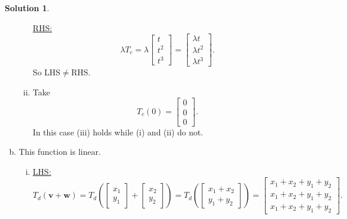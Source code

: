 \documentclass[12pt]{report} %
\theoremstyle{definition}
\newtheorem{solution}{Solution}
\begin{document}
\begin{solution}
\begin{enumerate}[(a)]
\begin{enumerate}[(i)]
        \noindent\underline{RHS:}
        \[
        \lambda T_c=\lambda \begin{bmatrix} t \\ t^2 \\ t^3 \end{bmatrix} = \begin{bmatrix} \lambda t \\ \lambda t^2 \\ \lambda t^3 \end{bmatrix}.
        \]
        So LHS$\neq$RHS.
        
        \item Take
        \[
        T_c(0)=\begin{bmatrix} 0\\0\\0\end{bmatrix}.
        \]
        In this case (iii) holds while (i) and (ii) do not.
    \end{enumerate}
    
    \item This function is linear.
    
    \begin{enumerate}[(i)]
        \item \noindent\underline{LHS:}
        \[
        T_d(\mathbf{v}+\mathbf{w})=T_d\left( \begin{bmatrix} x_1\\y_1 \end{bmatrix} + \begin{bmatrix} x_2\\y_2 \end{bmatrix} \right) =T_d\left( \begin{bmatrix} x_1+x_2\\y_1+y_2 \end{bmatrix}\right) = \begin{bmatrix} x_1+x_2+y_1+y_2\\x_1+x_2+y_1+y_2\\ x_1+x_2+y_1+y_2 \end{bmatrix}.
        \]
        

\end{enumerate}
\end{enumerate}
\end{solution}
\end{document}
